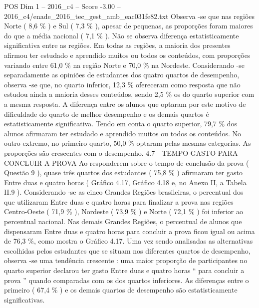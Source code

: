 \begin{textsample}{POS Dim 1 – 2016\_c4 – Score -3.00 – 2016\_c4/enade\_2016\_tec\_gest\_amb\_eac031fe82.txt}
Observa -se que nas regiões Norte ( 8,6 \% ) e Sul ( 7,3 \% ), apesar de pequenas, as proporções foram maiores do que a média nacional ( 7,1 \% ).
Não se observa diferença estatisticamente significativa entre as regiões.
Em todas as regiões, a maioria dos presentes afirmou ter estudado e aprendido muitos ou todos os conteúdos, com proporções variando entre 61,0 \% na região Norte e 70,0 \% na Nordeste.
Considerando -se separadamente as opiniões de estudantes dos quatro quartos de desempenho, observa -se que, no quarto inferior, 12,3 \% ofereceram como resposta que não estudou ainda a maioria desses conteúdos, sendo 2,5 \% os do quarto superior com a mesma resposta.
A diferença entre os alunos que optaram por este motivo de dificuldade do quarto de melhor desempenho e os demais quartos é estatisticamente significativa.
Tendo em conta o quarto superior, 79,7 \% dos alunos afirmaram ter estudado e aprendido muitos ou todos os conteúdos.
No outro extremo, no primeiro quarto, 50,0 \% optaram pelas mesmas categorias.
As proporções são crescentes com o desempenho. 4.7 - TEMPO GASTO PARA CONCLUIR A PROVA Ao responderem sobre o tempo de conclusão da prova ( Questão 9 ), quase três quartos dos estudantes ( 75,8 \% ) afirmaram ter gasto Entre duas e quatro horas ( Gráfico 4.17, Gráfico 4.18 e, no Anexo II, a Tabela II.9 ).
Considerando -se as cinco Grandes Regiões brasileiras, o percentual dos que utilizaram Entre duas e quatro horas para finalizar a prova nas regiões Centro-Oeste ( 71,9 \% ), Nordeste ( 73,9 \% ) e Norte ( 72,1 \% ) foi inferior ao percentual nacional.
Nas demais Grandes Regiões, o percentual de alunos que dispensaram Entre duas e quatro horas para concluir a prova ficou igual ou acima de 76,3 \%, como mostra o Gráfico 4.17.
Uma vez sendo analisadas as alternativas escolhidas pelos estudantes que se situam nos diferentes quartos de desempenho, observa -se uma tendência crescente : uma maior proporção de participantes no quarto superior declarou ter gasto Entre duas e quatro horas “ para concluir a prova ” quando comparadas com os dos quartos inferiores.
As diferenças entre o primeiro ( 67,4 \% ) e os demais quartos de desempenho são estatisticamente significativas.

\end{textsample}
